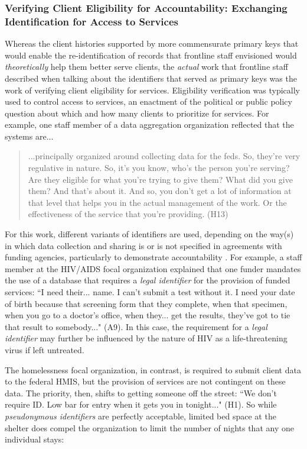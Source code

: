\subsubsection{Verifying Client Eligibility for Accountability: Exchanging Identification for Access to Services}
Whereas the client histories supported by more commensurate primary keys that would enable the re-identification of records that frontline staff envisioned would \textit{theoretically} help them better serve clients, the \textit{actual} work that frontline staff described when talking about the identifiers that served as primary keys was the work of verifying client eligibility for services. Eligibility verification was typically used to control access to services, an enactment of the political or public policy question about which and how many clients to prioritize for services. For example, one staff member of a data aggregation organization reflected that the systems are...

\begin{quote}\singlespacing ...principally organized around collecting data for the feds. So, they're very regulative in nature. So, it's you know, who's the person you're serving? Are they eligible for what you're trying to give them? What did you give them? And that's about it. And so, you don't get a lot of information at that level that helps you in the actual management of the work. Or the effectiveness of the service that you're providing. (H13) \end{quote}

For this work, different variants of identifiers are used, depending on the way(s) in which data collection and sharing is or is not specified in agreements with funding agencies, particularly to demonstrate accountability \citep{Smith1993Contracting}. For example, a staff member at the HIV/AIDS focal organization explained that one funder mandates the use of a database that requires a \textit{legal identifier} for the provision of funded services: ``I need their... name. I can't submit a test without it. I need your date of birth because that screening form that they complete, when that specimen, when you go to a doctor's office, when they... get the results, they've got to tie that result to somebody..." (A9). In this case, the requirement for a \textit{legal identifier} may further be influenced by the nature of HIV as a life-threatening virus if left untreated.

The homelessness focal organization, in contrast, is required to submit client data to the federal HMIS, but the provision of services are not contingent on these data. The priority, then, shifts to getting someone off the street: ``We don't require ID. Low bar for entry when it gets you in tonight..." (H1). So while \textit{pseudonymous identifiers} are perfectly acceptable, limited bed space at the shelter does compel the organization to limit the number of nights that any one individual stays:

